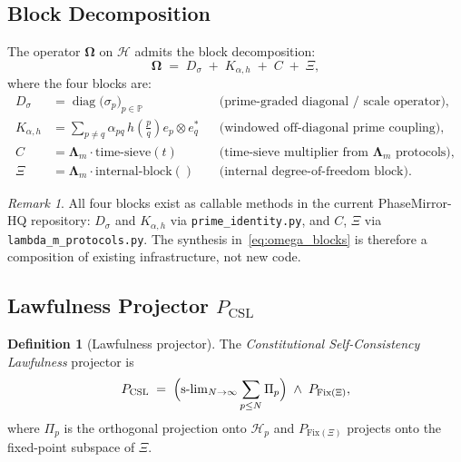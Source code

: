 \documentclass[12pt,a4paper]{article}
\theoremstyle{plain}
\theoremstyle{definition}
\newtheorem{definition}[theorem]{Definition}
\theoremstyle{remark}
\newtheorem{remark}[theorem]{Remark}
\newcommand{\Hil}{\mathcal{H}}
\newcommand{\PP}{\mathbb{P}}
\newcommand{\Pcsl}{P_{\mathrm{CSL}}}
\newcommand{\Dsig}{D_{\sigma}}
\newcommand{\Kalpha}{K_{\alpha,h}}
\newcommand{\Lam}{\boldsymbol{\Lambda}_m}
\begin{document}
\subsection{Block Decomposition}
\label{sec:blocks}

The operator $\boldsymbol{\Omega}$ on $\Hil$ admits the block decomposition:
\begin{equation}
  \boldsymbol{\Omega} \;=\; \Dsig \;+\; \Kalpha \;+\; C \;+\; \Xi,
  \label{eq:omega_blocks}
\end{equation}
where the four blocks are:
\begin{align}
  \Dsig &= \operatorname{diag}\!\bigl(\sigma_p\bigr)_{p\in\PP}
           && \text{(prime-graded diagonal / scale operator)},
  \label{eq:Dsig}\\[4pt]
  \Kalpha &= \sum_{p \ne q} \alpha_{pq}\,
             h\!\left(\tfrac{p}{q}\right) e_p \otimes e_q^*
           && \text{(windowed off-diagonal prime coupling)},
  \label{eq:K}\\[4pt]
  C &= \Lam \cdot \mathrm{time\text{-}sieve}(t)
           && \text{(time-sieve multiplier from }\Lam\text{ protocols)},
  \label{eq:C}\\[4pt]
  \Xi &= \Lam \cdot \mathrm{internal\text{-}block}()
           && \text{(internal degree-of-freedom block)}.
  \label{eq:Xi2}
\end{align}

\begin{remark}
All four blocks exist as callable methods in the current PhaseMirror-HQ
repository: $\Dsig$ and $\Kalpha$ via \texttt{prime\_identity.py},
and $C$, $\Xi$ via \texttt{lambda\_m\_protocols.py}.
The synthesis in~\eqref{eq:omega_blocks} is therefore a composition
of existing infrastructure, not new code.
\end{remark}

\subsection{Lawfulness Projector $\Pcsl$}
\label{sec:pcsl}

\begin{definition}[Lawfulness projector]
The \emph{Constitutional Self-Consistency Lawfulness} projector is
\begin{equation}
  \Pcsl \;=\; \Bigl(\operatorname{s-lim}_{N\to\infty}
             \sum_{p \le N} \Pi_p\Bigr) \;\wedge\; P_{\mathrm{Fix}(\Xi)},
  \label{eq:pcsl}
\end{equation}
where $\Pi_p$ is the orthogonal projection onto $\Hil_p$ and
$P_{\mathrm{Fix}(\Xi)}$ projects onto the fixed-point subspace of $\Xi$.
\end{definition}
\end{document}
